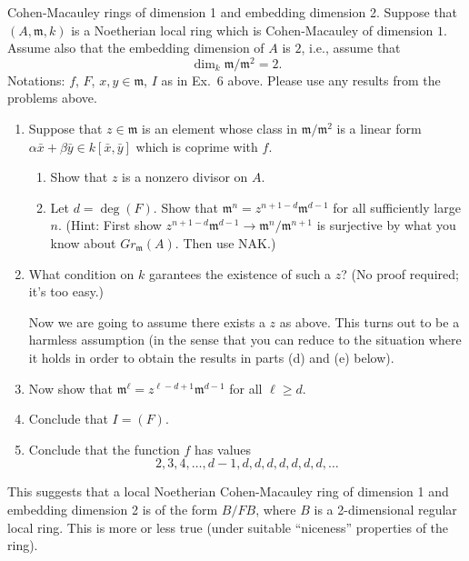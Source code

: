 \begin{exercise}
Cohen-Macauley rings of dimension 1 and embedding dimension 2.
Suppose that $(A,{\mathfrak m},k)$ is a Noetherian local ring which is Cohen-Macauley
of dimension $1$. Assume also that the embedding dimension of $A$ is
$2$, i.e., assume that
$$
\dim_k {\mathfrak m}/{\mathfrak m}^2 = 2.	
$$
Notations: $f$, $F$, $x,y\in {\mathfrak m}$, $I$ as in Ex.\ 6 above. Please
use any results from the problems above.
\begin{enumerate}
\item Suppose that $z\in {\mathfrak m}$ is an element whose class
in ${\mathfrak m}/{\mathfrak m}^2$ is a linear form
$\alpha \bar x + \beta \bar y \in k[\bar x, \bar y]$
which is coprime with $f$.
\begin{enumerate}
\item Show that $z$ is a nonzero divisor on $A$.
\item Let $d = \deg(F)$.
Show that ${\mathfrak m}^n = z^{n+1-d}{\mathfrak m}^{d-1}$
for all sufficiently large $n$. (Hint: First show
$z^{n+1-d}{\mathfrak m}^{d-1} \to {\mathfrak m}^n/{\mathfrak m}^{n+1}$
is surjective by what you know about $Gr_{\mathfrak m}(A)$. Then use NAK.)
\end{enumerate}
\item What condition on $k$ garantees the existence of 
such a $z$? (No proof required; it's too easy.)

\noindent
Now we are going to assume there exists a $z$ as above. This turns out
to be a harmless assumption (in the sense that you can reduce to
the situation where it holds in order to obtain the results in
parts (d) and (e) below).
\item Now show that ${\mathfrak m}^\ell = z^{\ell-d+1} {\mathfrak m}^{d-1}$
for all $\ell \geq d$.
\item Conclude that $I = (F)$.
\item Conclude that the function $f$ has values
$$
2,3,4,\ldots,d-1,d,d,d,d,d,d,d,\ldots
$$
\end{enumerate}
\end{exercise}

\begin{remark}
This suggests that a local Noetherian Cohen-Macauley ring of dimension 1
and embedding dimension 2 is of the form $B/FB$, where $B$ is a 2-dimensional
regular local ring. This is more or less true (under suitable ``niceness''
properties of the ring).
\end{remark}






